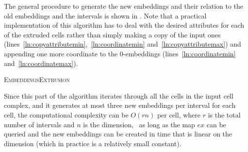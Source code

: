 The general procedure to generate the new embeddings and their relation to the old embeddings and the intervals is shown in .
Note that a practical implementation of this algorithm has to deal with the desired attributes for each of the extruded cells rather than simply making a copy of the input ones (lines~\ref{ln:copyattributemin},~\ref{ln:coordinatemin} and~\ref{ln:copyattributemax}) and appending one more coordinate to the 0-embeddings (lines~\ref{ln:coordinatemin} and~\ref{ln:coordinatemax}).

\begin{algorithm}[tb]
\small
{}
\DontPrintSemicolon{}
\caption{\textsc{EmbeddingsExtrusion}}\label{algo:embeddingsextrusion}
\end{algorithm}

Since this part of the algorithm iterates through all the cells in the input cell complex, and it generates at most three new embeddings per interval for each cell, the computational complexity can be $O(rn)$ per cell, where $r$ is the total number of intervals and $n$ is the dimension, \ie\ as long as the map $ex$ can be queried and the new embeddings can be created in time that is linear on the dimension (which in practice is a relatively small constant).

